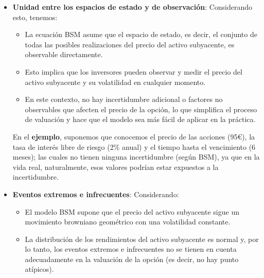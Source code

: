 \begin{problema}[Problema D]
\begin{itemize}
\begin{sol}
\begin{itemize}
    \item \textbf{Unidad entre los espacios de estado y de observación}: Considerando esto, tenemos: 
    \begin{itemize}
        \item La ecuación BSM asume que el espacio de estado, es decir, el conjunto de todas las posibles realizaciones del precio del activo subyacente, es observable directamente.
        \item Esto implica que los inversores pueden observar y medir el precio del activo subyacente y su volatilidad en cualquier momento.
        \item En este contexto, no hay incertidumbre adicional o factores no observables que afecten el precio de la opción, lo que simplifica el proceso de valuación y hace que el modelo sea más fácil de aplicar en la práctica.
    \end{itemize}
    \begin{cajita}
        En el \textbf{ejemplo}, suponemos que conocemos el precio de las acciones  (95€), la tasa de interés libre de riesgo (2\% anual) y el tiempo hasta el vencimiento (6 meses); las cuales no tienen ninguna incertidumbre (según BSM), ya que en la vida real, naturalmente, esos valores podrían estar expuestos a la incertidumbre. 
    \end{cajita}
    
    
    \item \textbf{Eventos extremos e infrecuentes}: Considerando: 
    \begin{itemize}
        \item El modelo BSM supone que el precio del activo subyacente sigue un movimiento browniano geométrico con una volatilidad constante.
        \item La distribución de los rendimientos del activo subyacente es normal y, por lo tanto, los eventos extremos e infrecuentes no se tienen en cuenta adecuadamente en la valuación de la opción (es decir, no hay punto atípicos).
        

\end{itemize}
\end{itemize}
\end{sol}
\end{itemize}
\end{problema}
